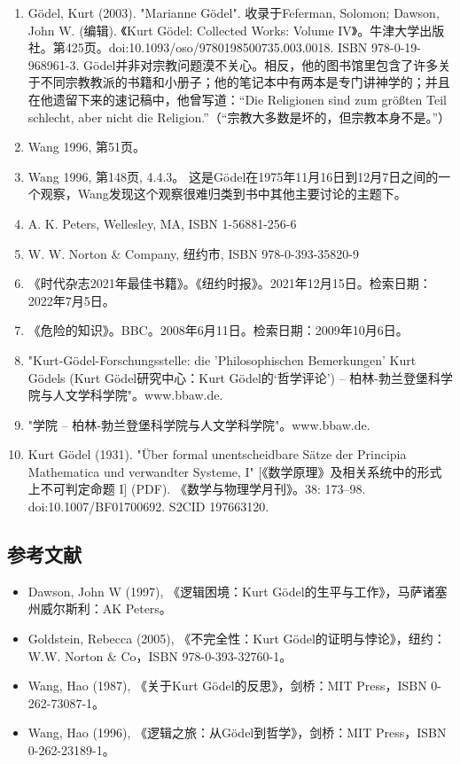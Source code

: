 \begin{enumerate}
\item Gödel, Kurt (2003). "Marianne Gödel". 收录于Feferman, Solomon; Dawson, John W. (编辑). 《Kurt Gödel: Collected Works: Volume IV》。牛津大学出版社。第425页。doi:10.1093/oso/9780198500735.003.0018. ISBN 978-0-19-968961-3. Gödel并非对宗教问题漠不关心。相反，他的图书馆里包含了许多关于不同宗教教派的书籍和小册子；他的笔记本中有两本是专门讲神学的；并且在他遗留下来的速记稿中，他曾写道：“Die Religionen sind zum größten Teil schlecht, aber nicht die Religion.”（“宗教大多数是坏的，但宗教本身不是。”）  
\item Wang 1996, 第51页。  
\item Wang 1996, 第148页, 4.4.3。 这是Gödel在1975年11月16日到12月7日之间的一个观察，Wang发现这个观察很难归类到书中其他主要讨论的主题下。  
\item A. K. Peters, Wellesley, MA, ISBN 1-56881-256-6  
\item W. W. Norton & Company, 纽约市, ISBN 978-0-393-35820-9  
\item 《时代杂志2021年最佳书籍》。《纽约时报》。2021年12月15日。检索日期：2022年7月5日。  
\item 《危险的知识》。BBC。2008年6月11日。检索日期：2009年10月6日。  
\item "Kurt-Gödel-Forschungsstelle: die 'Philosophischen Bemerkungen' Kurt Gödels (Kurt Gödel研究中心：Kurt Gödel的‘哲学评论’) – 柏林-勃兰登堡科学院与人文学科学院"。www.bbaw.de.  
\item "学院 – 柏林-勃兰登堡科学院与人文学科学院"。www.bbaw.de.  
\item Kurt Gödel (1931). "Über formal unentscheidbare Sätze der Principia Mathematica und verwandter Systeme, I" [《数学原理》及相关系统中的形式上不可判定命题 I] (PDF). 《数学与物理学月刊》。38: 173–98. doi:10.1007/BF01700692. S2CID 197663120.
\end{enumerate}
\subsection{参考文献}  
\begin{itemize}
\item Dawson, John W (1997), 《逻辑困境：Kurt Gödel的生平与工作》，马萨诸塞州威尔斯利：AK Peters。  
\item Goldstein, Rebecca (2005), 《不完全性：Kurt Gödel的证明与悖论》，纽约：W.W. Norton & Co，ISBN 978-0-393-32760-1。  
\item Wang, Hao (1987), 《关于Kurt Gödel的反思》，剑桥：MIT Press，ISBN 0-262-73087-1。  
\item Wang, Hao (1996), 《逻辑之旅：从Gödel到哲学》，剑桥：MIT Press，ISBN 0-262-23189-1。
\end{itemize}
